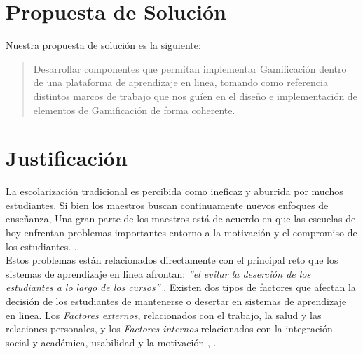 \section{Propuesta de Solución}
\label{sec:propuesta}

    Nuestra propuesta de solución es la siguiente:
    \begin{quote}
    \colorbox{blue!05}{\parbox{\dimexpr\linewidth-2\fboxsep}{\strut
        Desarrollar componentes que permitan implementar Gamificación dentro de una plataforma de aprendizaje en linea, tomando como referencia distintos marcos de trabajo que nos guíen en el diseño e implementación de elementos de Gamificación de forma coherente. 
    \strut}}
    \end{quote}

\clearpage
\section{Justificación}
\label{sec:justificacion}


    La escolarización tradicional es percibida como ineficaz y aburrida por muchos estudiantes. Si bien los maestros buscan continuamente nuevos enfoques de enseñanza, Una gran parte de los maestros está de acuerdo en que las escuelas de hoy enfrentan problemas importantes entorno a la motivación y el compromiso de los estudiantes. \cite{objetivo1}.\\

    \noindent Estos problemas están relacionados directamente con el principal reto que los sistemas de aprendizaje en linea afrontan: {\it''el evitar la deserción de los estudiantes a lo largo de los cursos''} \cite{objetivo1}. Existen dos tipos de factores que afectan la decisión de los estudiantes de mantenerse o desertar en sistemas de aprendizaje en linea. Los {\it Factores externos}, relacionados con el trabajo, la salud y las relaciones personales, y los {\it Factores internos} relacionados con la integración social y académica, usabilidad y la motivación \cite{problematica1}, \cite{dropoutOnline}.\\
    
    
